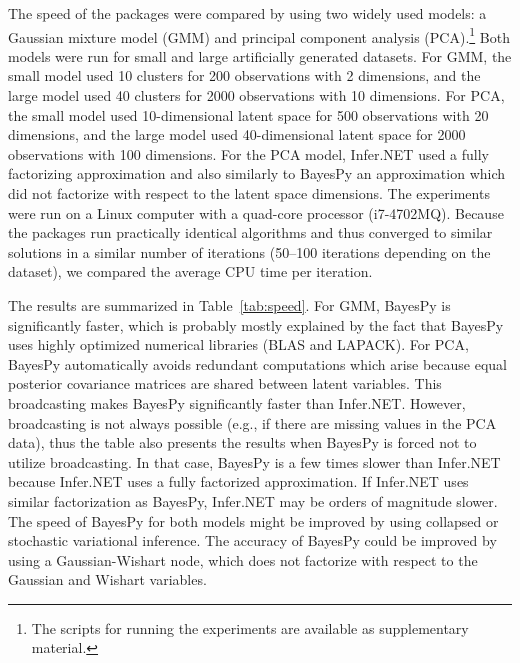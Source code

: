 \documentclass[twoside,11pt]{article}
\begin{document}
The speed of the packages were compared by using two widely used models: a
Gaussian mixture model (GMM) and principal component analysis
(PCA).\footnote{The scripts for running the experiments are available as
  supplementary material.}  Both models were run for small and large
artificially generated datasets.  For GMM, the small model used 10 clusters for
200 observations with 2 dimensions, and the large model used 40 clusters for
2000 observations with 10 dimensions.  For PCA, the small model used
10-dimensional latent space for 500 observations with 20 dimensions, and the
large model used 40-dimensional latent space for 2000 observations with 100
dimensions.
For the PCA model, Infer.NET used a fully factorizing approximation and also
similarly to BayesPy an approximation which did not factorize with respect to
the latent space dimensions.
The experiments were run on a Linux computer with a quad-core processor
(i7-4702MQ).  Because the packages run practically identical algorithms and thus
converged to similar solutions in a similar number of iterations (50--100
iterations depending on the dataset), we compared the average CPU time per
iteration.


The results are summarized in Table~\ref{tab:speed}.  For GMM, BayesPy is
significantly faster, which is probably mostly explained by the fact that
BayesPy uses highly optimized numerical libraries (BLAS and LAPACK).  For PCA,
BayesPy automatically avoids redundant computations which arise because equal
posterior covariance matrices are shared between latent variables.  This
broadcasting makes BayesPy significantly faster than Infer.NET.  However,
broadcasting is not always possible (e.g., if there are missing values in the
PCA data), thus the table also presents the results when BayesPy is forced not
to utilize broadcasting.  In that case, BayesPy is a few times slower than
Infer.NET because Infer.NET uses a fully factorized approximation.  If Infer.NET
uses similar factorization as BayesPy, Infer.NET may be orders of magnitude
slower.
The speed of BayesPy for both models might be improved by using collapsed or
stochastic variational inference.  The accuracy of BayesPy could be improved by
using a Gaussian-Wishart node, which does not factorize with respect to the
Gaussian and Wishart variables.
\end{document}

